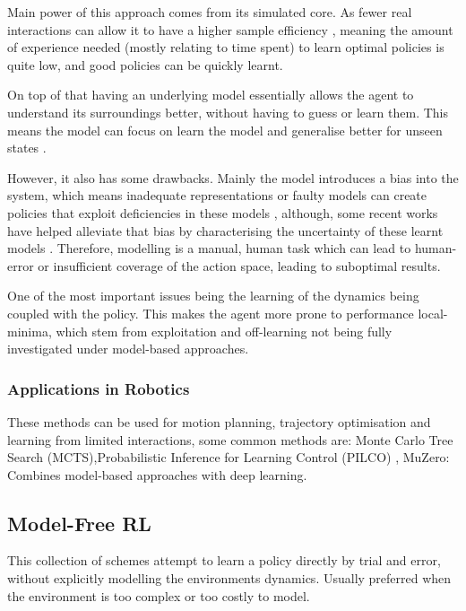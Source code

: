  Main power of this approach comes from its simulated core. As fewer real interactions can allow it to have a higher sample efficiency \cite{liu2021DRLminireview,wu23robotLearn}, meaning the amount of experience needed (mostly relating to time spent) to learn optimal policies is quite low, and good policies can be quickly learnt.

  On top of that having an underlying model essentially allows the agent to understand its surroundings better, without having to guess or learn them. This means the model can focus on learn the model and generalise better for unseen states \cite{MAL-086}.
  
  However, it also has some drawbacks. Mainly the model introduces a bias into the system, which means inadequate representations or faulty models can create policies that exploit deficiencies in these models \cite{Deisenroth2011PILCO,wang2019benchmarkingmodelbasedreinforcementlearning}, although, some recent works have helped alleviate that bias by characterising the uncertainty of these learnt models \cite{kurutach2018modelensembletrustregionpolicyoptimization,chua2018deepreinforcementlearninghandful,clavera2018modelbasedreinforcementlearningmetapolicy}. Therefore, modelling is a manual, human task which can lead to human-error or insufficient coverage of the action space, leading to suboptimal results.

  One of the most important issues being the learning of the dynamics being coupled with the policy. This makes the agent more prone to performance local-minima, which stem from exploitation and off-learning not being fully investigated under model-based approaches.

  \subsubsection{Applications in Robotics}
  These methods can be used for motion planning, trajectory optimisation and learning from limited interactions, some common methods are: Monte Carlo Tree Search (MCTS),Probabilistic Inference for Learning Control (PILCO) \cite{Deisenroth2011PILCO}, MuZero: Combines model-based approaches with deep learning.
  
  \subsection{Model-Free RL}
  This collection of schemes attempt to learn a policy directly by trial and error, without explicitly modelling the environments dynamics. Usually preferred when the environment is too complex or too costly to model.

